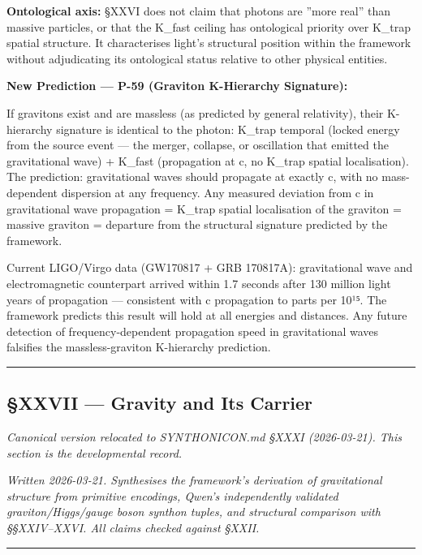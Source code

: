 \documentclass[12pt,a4paper]{article}
\begin{document}
\textbf{Ontological axis:} §XXVI does not claim that photons are ''more real'' than massive particles, or that the K\_fast ceiling has ontological priority over K\_trap spatial structure. It characterises light's structural position within the framework without adjudicating its ontological status relative to other physical entities.

\textbf{New Prediction --- P-59 (Graviton K-Hierarchy Signature):}

If gravitons exist and are massless (as predicted by general relativity), their K-hierarchy signature is identical to the photon: K\_trap temporal (locked energy from the source event --- the merger, collapse, or oscillation that emitted the gravitational wave) + K\_fast (propagation at c, no K\_trap spatial localisation). The prediction: gravitational waves should propagate at exactly c, with no mass-dependent dispersion at any frequency. Any measured deviation from c in gravitational wave propagation = K\_trap spatial localisation of the graviton = massive graviton = departure from the structural signature predicted by the framework.

Current LIGO/Virgo data (GW170817 + GRB 170817A): gravitational wave and electromagnetic counterpart arrived within 1.7 seconds after 130 million light years of propagation --- consistent with c propagation to parts per 10¹⁵. The framework predicts this result will hold at all energies and distances. Any future detection of frequency-dependent propagation speed in gravitational waves falsifies the massless-graviton K-hierarchy prediction.

\begin{center}
\rule{0.5\textwidth}{0.4pt}
\end{center}

\subsection{§XXVII --- Gravity and Its Carrier}

\emph{Canonical version relocated to SYNTHONICON.md §XXXI (2026-03-21). This section is the developmental record.}

\emph{Written 2026-03-21. Synthesises the framework's derivation of gravitational structure from primitive encodings, Qwen's independently validated graviton/Higgs/gauge boson synthon tuples, and structural comparison with §§XXIV--XXVI. All claims checked against §XXII.}

\begin{center}
\rule{0.5\textwidth}{0.4pt}
\end{center}
\end{document}
